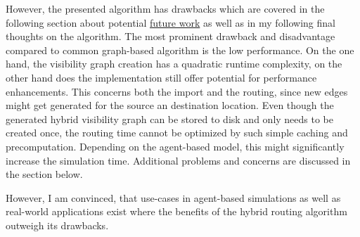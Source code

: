	However, the presented algorithm has drawbacks which are covered in the following section about potential \hyperref[sec:future-work]{future work} as well as in my following final thoughts on the algorithm.
	The most prominent drawback and disadvantage compared to common graph-based algorithm is the low performance.
	On the one hand, the visibility graph creation has a quadratic runtime complexity, on the other hand does the implementation still offer potential for performance enhancements.
	This concerns both the import and the routing, since new edges might get generated for the source an destination location.
	Even though the generated hybrid visibility graph can be stored to disk and only needs to be created once, the routing time cannot be optimized by such simple caching and precomputation.
	Depending on the agent-based model, this might significantly increase the simulation time.
	Additional problems and concerns are discussed in the section below.
	
	However, I am convinced, that use-cases in agent-based simulations as well as real-world applications exist where the benefits of the hybrid routing algorithm outweigh its drawbacks.
